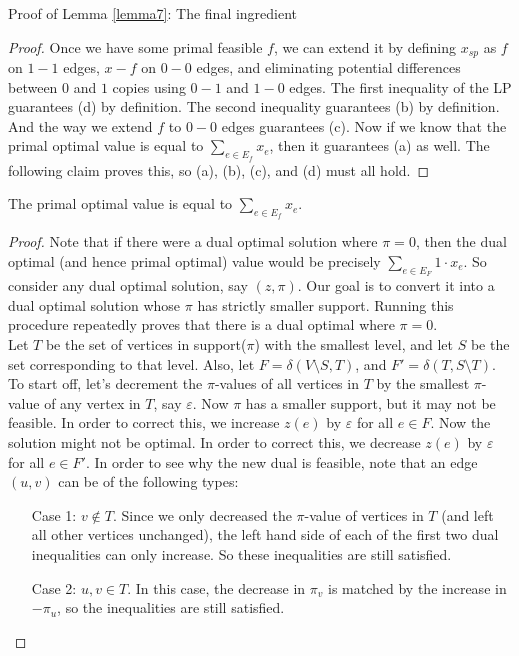 \documentclass[./main.tex]{subfiles}
\begin{document}
\begin{subsection}{Proof of Lemma \ref{lemma7}: The final ingredient}
\begin{proof}
Once we have some primal feasible $f$, we can extend it by defining $x_{sp}$ as $f$ on $1-1$ edges, $x-f$ on $0-0$ edges, and eliminating potential differences between $0$ and $1$ copies using $0-1$ and $1-0$ edges. 
The first inequality of the LP guarantees (d) by definition. 
The second inequality guarantees (b) by definition. And the way we extend $f$ to $0-0$ edges guarantees (c). 
Now if we know that the primal optimal value is equal to $\sum_{e\in E_f}x_e$, then it guarantees (a) as well. The following claim proves this, so (a), (b), (c), and (d) must all hold.	\end{proof}
\vspace{2mm}
	\begin{claim}
		The primal optimal value is equal to $\sum_{e\in E_f}x_e$.
	\end{claim}
	\begin{proof}
		Note that if there were a dual optimal solution where $\pi = 0$, then the dual optimal (and hence primal optimal) value would be precisely $\sum_{e\in E_F}1\cdot x_e$. 
		So consider any dual optimal solution, say $(z,\pi)$. Our goal is to convert it into a dual optimal solution whose $\pi$ has strictly smaller support. 
		Running this procedure repeatedly proves that there is a dual optimal where $\pi = 0$.\vspace{2mm}
		\\Let $T$ be the set of vertices in support($\pi$) with the smallest level, and let $S$ be the set corresponding to that level.
		Also, let $F = \delta(V\setminus S, T)$, and $F' = \delta(T,S\setminus T)$.
		\\To start off, let's decrement the $\pi$-values of all vertices in $T$ by the smallest $\pi$-value of any vertex in $T$, say $\varepsilon$. Now $\pi$ has a smaller support, but it may not be feasible. In order to correct this, we increase $z(e)$ by $\varepsilon$ for all $e\in F$. Now the solution might not be optimal. In order to correct this, we decrease $z(e)$ by $\varepsilon$ for all $e\in F'$. In order to see why the new dual is feasible, note that an edge $(u,v)$ can be of the following types:
		\begin{itemize}
		\item[Case 1:] $v\notin T$. Since we only decreased the $\pi$-value of vertices in $T$ (and left all other vertices unchanged), the left hand side of each of the first two dual inequalities can only increase. So these inequalities are still satisfied.
		\item[Case 2:] $u,v\in T$. In this case, the decrease in $\pi_v$ is matched by the increase in $-\pi_u$, so the inequalities are still satisfied.

\end{itemize}
\end{proof}
\end{subsection}
\end{document}

